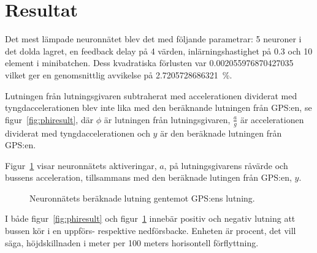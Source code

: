 \section{Resultat}
Det mest lämpade neuronnätet blev det med följande parametrar:
\SI{5}{\styck} neuroner i det dolda lagret, en feedback delay på \SI{4}{\styck} värden,
inlärningshastighet på \num{0.3} och \SI{10}{\styck} element i minibatchen.
Dess kvadratiska förlusten var \num[round-precision=3]{0.002055976870427035}
vilket ger en genomsnittlig avvikelse på
\SI[round-precision=3]{2.7205728686321}{\percent}.

Lutningen från lutningsgivaren subtraherat med accelerationen dividerat med tyngdaccelerationen
blev inte lika med den beräknande lutningen från GPS:en, se figur~\ref{fig:phiresult},
där $\phi$ är lutningen från lutningsgivaren,
$\frac{a}{g}$ är accelerationen dividerat med tyngdaccelerationen
och $y$ är den beräknade lutningen från GPS:en.

Figur~\ref{fig:netresult} visar neuronnätets aktiveringar, $a$, på
lutningsgivarens råvärde och bussens acceleration,
tillsammans med den beräknade lutingen från GPS:en, $y$.

\begin{figure}
	\centering
	\caption{Neuronnätets beräknade lutning gentemot GPS:ens lutning. \label{fig:netresult}}
\end{figure}

I både figur~\ref{fig:phiresult} och figur~\ref{fig:netresult} innebär
positiv och negativ lutning att bussen kör i en uppförs- respektive nedförsbacke.
Enheten är procent, det vill säga,
höjdskillnaden i meter per 100 meters horisontell förflyttning.

